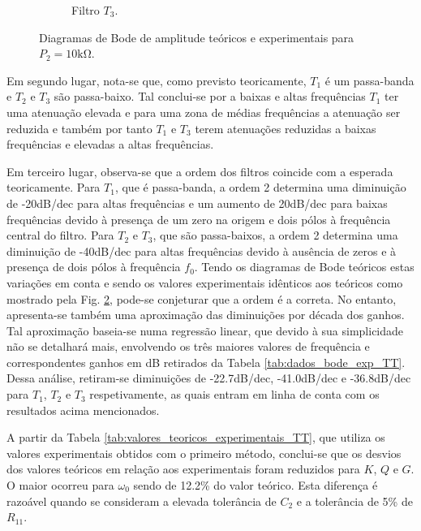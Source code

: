 \begin{figure}[ht]
\begin{subfigure}[b]{0.45\textwidth}
         \caption{Filtro $T_3$.}
         \label{fig:bode_exp_TT_P2_10kohm_T3}
     \end{subfigure}
    \hfill
    \caption{Diagramas de Bode de amplitude teóricos e experimentais para $P_2 = 10 \si{\kilo \ohm}$.}
    \label{fig:bode_exp_TT_P2_10kohm}
\end{figure}

Em segundo lugar, nota-se que, como previsto teoricamente, $T_1$ é um passa-banda e $T_2$ e $T_3$ são passa-baixo. Tal conclui-se por a baixas e altas frequências $T_1$ ter uma atenuação elevada e para uma zona de médias frequências a atenuação ser reduzida e também por tanto $T_1$ e $T_3$ terem atenuações reduzidas a baixas frequências e elevadas a altas frequências.

Em terceiro lugar, observa-se que a ordem dos filtros coincide com a esperada teoricamente. Para $T_1$, que é passa-banda, a ordem 2 determina uma diminuição de -20dB/dec para altas frequências e um aumento de 20dB/dec para baixas frequências devido à presença de um zero na origem e dois pólos à frequência central do filtro. Para $T_2$ e $T_3$, que são passa-baixos, a ordem 2 determina uma diminuição de -40dB/dec para altas frequências devido à ausência de zeros e à presença de dois pólos à frequência $f_0$. Tendo os diagramas de Bode teóricos estas variações em conta e sendo os valores experimentais idênticos aos teóricos como mostrado pela Fig. \ref{fig:bode_exp_TT_P2_10kohm}, pode-se conjeturar que a ordem é a correta. No entanto, apresenta-se também uma aproximação das diminuições por década dos ganhos. Tal aproximação baseia-se numa regressão linear, que devido à sua simplicidade não se detalhará mais, envolvendo os três maiores valores de frequência e correspondentes ganhos em dB retirados da Tabela \ref{tab:dados_bode_exp_TT}. Dessa análise, retiram-se diminuições de -22.7dB/dec, -41.0dB/dec e -36.8dB/dec para $T_1$, $T_2$ e $T_3$ respetivamente, as quais entram em linha de conta com os resultados acima mencionados.

A partir da Tabela \ref{tab:valores_teoricos_experimentais_TT}, que utiliza os valores experimentais obtidos com o primeiro método, conclui-se que os desvios dos valores teóricos em relação aos experimentais foram reduzidos para $K$, $Q$ e $G$. O maior ocorreu para $\omega_0$ sendo de 12.2\% do valor teórico. Esta diferença é razoável quando se consideram a elevada tolerância de $C_2$ e a tolerância de 5\% de $R_{11}$. 

